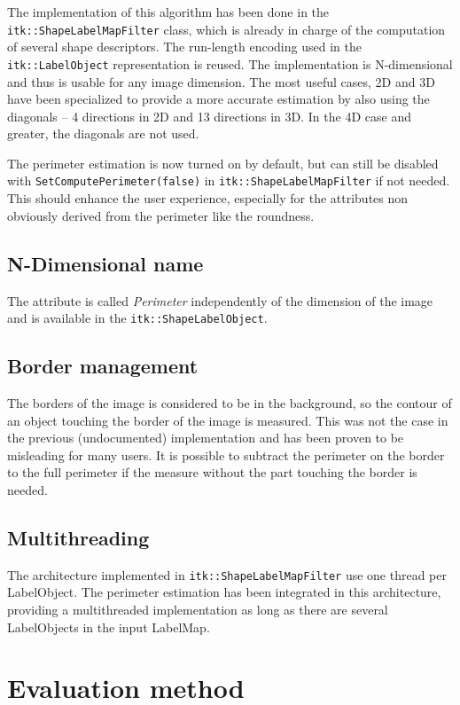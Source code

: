 \documentclass{InsightArticle}
\begin{document}
The implementation of this algorithm has been done in the \verb$itk::ShapeLabelMapFilter$ class, which is already in charge of the computation of
several shape descriptors. The run-length encoding used in the \verb$itk::LabelObject$ representation is reused.
The implementation is N-dimensional and thus is usable for any image dimension. The most useful cases, 2D and 3D have been specialized
to provide a more accurate estimation by also using the diagonals -- 4 directions in 2D and 13 directions in 3D. In the 4D case and greater,
the diagonals are not used.

The perimeter estimation is now turned on by default, but can still be disabled with \verb$SetComputePerimeter(false)$ in
\verb$itk::ShapeLabelMapFilter$ if not needed. This should enhance the user experience, especially for the attributes non obviously derived
from the perimeter like the roundness.

\subsection{N-Dimensional name}
The attribute is called {\em Perimeter} independently of the dimension of the image and is available in the \verb$itk::ShapeLabelObject$.

\subsection{Border management}

The borders of the image is considered to be in the background, so the contour of an object touching the border of the image is measured.
This was not the case in the previous (undocumented) implementation and has been proven to be misleading for many users.
It is possible to subtract the perimeter on the border to the full perimeter if the measure without the part touching the border is needed.

\subsection{Multithreading}

The architecture implemented in \verb$itk::ShapeLabelMapFilter$ use one thread per LabelObject. The perimeter estimation has been integrated in this
architecture, providing a multithreaded implementation as long as there are several LabelObjects in the input LabelMap.


\section{Evaluation method}
\end{document}
